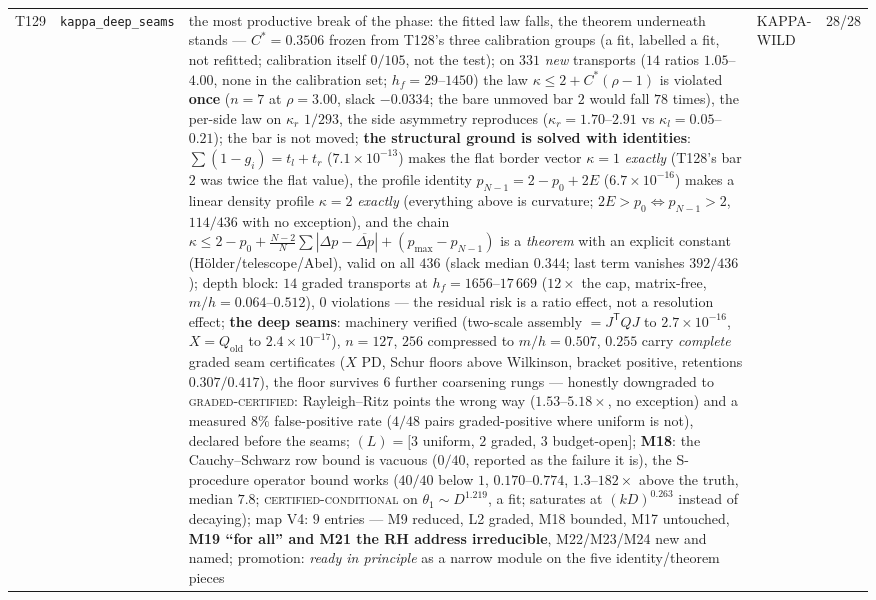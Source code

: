 \documentclass[11pt,a4paper]{article}
\begin{document}
{\begin{xltabular}{\linewidth}{@{}p{0.95cm} >{\raggedright\arraybackslash}p{3.1cm} Y >{\raggedright\scriptsize\arraybackslash}p{3.35cm} p{1.15cm}@{}}
T129 & \texttt{\scriptsize kappa\_\allowbreak deep\_\allowbreak seams} & the most productive break of the phase: the fitted law falls, the theorem underneath stands --- $C^*=0.3506$ frozen from T128's three calibration groups (a fit, labelled a fit, not refitted; calibration itself $0/105$, not the test); on $331$ \emph{new} transports ($14$ ratios $1.05$--$4.00$, none in the calibration set; $h_f=29$--$1450$) the law $\kappa\le2+C^*(\rho-1)$ is violated \textbf{once} ($n=7$ at $\rho=3.00$, slack $-0.0334$; the bare unmoved bar $2$ would fall $78$ times), the per-side law on $\kappa_r$ $1/293$, the side asymmetry reproduces ($\kappa_r=1.70$--$2.91$ vs $\kappa_l=0.05$--$0.21$); the bar is not moved; \textbf{the structural ground is solved with identities}: $\sum(1-g_i)=t_l+t_r$ ($7.1\times10^{-13}$) makes the flat border vector $\kappa=1$ \emph{exactly} (T128's bar $2$ was twice the flat value), the profile identity $p_{N-1}=2-p_0+2E$ ($6.7\times10^{-16}$) makes a linear density profile $\kappa=2$ \emph{exactly} (everything above is curvature; $2E>p_0\iff p_{N-1}>2$, $114/436$ with no exception), and the chain $\kappa\le2-p_0+\frac{N-2}{N}\sum|\Delta p-\overline{\Delta p}|+(p_{\max}-p_{N-1})$ is a \emph{theorem} with an explicit constant (H\"older/telescope/Abel), valid on all $436$ (slack median $0.344$; last term vanishes $392/436$); depth block: $14$ graded transports at $h_f=1656$--$17\,669$ ($12\times$ the cap, matrix-free, $m/h=0.064$--$0.512$), $0$ violations --- the residual risk is a ratio effect, not a resolution effect; \textbf{the deep seams}: machinery verified (two-scale assembly $=J^{\mathsf T}QJ$ to $2.7\times10^{-16}$, $X=Q_{\mathrm{old}}$ to $2.4\times10^{-17}$), $n=127$, $256$ compressed to $m/h=0.507$, $0.255$ carry \emph{complete} graded seam certificates ($X$ PD, Schur floors above Wilkinson, bracket positive, retentions $0.307/0.417$), the floor survives $6$ further coarsening rungs --- honestly downgraded to \textsc{graded-certified}: Rayleigh--Ritz points the wrong way ($1.53$--$5.18\times$, no exception) and a measured $8\%$ false-positive rate ($4/48$ pairs graded-positive where uniform is not), declared before the seams; $(L)=[3$ uniform, $2$ graded, $3$ budget-open$]$; \textbf{M18}: the Cauchy--Schwarz row bound is vacuous ($0/40$, reported as the failure it is), the S-procedure operator bound works ($40/40$ below $1$, $0.170$--$0.774$, $1.3$--$182\times$ above the truth, median $7.8$; \textsc{certified-conditional} on $\theta_1\sim D^{1.219}$, a fit; saturates at $(kD)^{0.263}$ instead of decaying); map V4: $9$ entries --- M9 reduced, L2 graded, M18 bounded, M17 untouched, \textbf{M19 ``for all'' and M21 the RH address irreducible}, M22/M23/M24 new and named; promotion: \emph{ready in principle} as a narrow module on the five identity/theorem pieces & KAPPA-WILD & 28/28\\

\end{xltabular}}
\end{document}
